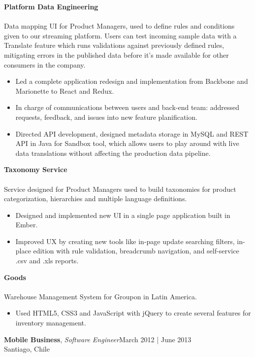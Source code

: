 \documentclass[line,letterpaper, 10pt]{res}
\begin{document}
\begin{resume}
	\textbf{Platform Data Engineering}\\ \\Data mapping UI for Product Managers, used to define rules and conditions given to our streaming platform. Users can test incoming sample data with a Translate feature which runs validations against previously defined rules, mitigating errors in the published data before it’s made available for other consumers in the company.\\
	\begin{itemize} \itemsep 3pt
	\item Led a complete application redesign and implementation from Backbone and Marionette to React and Redux.
	\item In charge of communications between users and back-end team: addressed requests, feedback, and issues into new feature planification.
	\item Directed API development, designed metadata storage in MySQL and REST API in Java for Sandbox tool, which allows users to play around with live data translations without affecting the production data pipeline.
	\end{itemize}

	\textbf{Taxonomy Service}\\ \\Service designed for Product Managers used to build taxonomies for product categorization, hierarchies and multiple language definitions.\\
	\begin{itemize} \itemsep 3pt
	\item Designed and implemented new UI in a single page application built in Ember.
	\item Improved UX by creating new tools like in-page update searching filters, in-place edition with rule validation, breadcrumb navigation, and self-service .csv and .xls reports.
	\end{itemize}

	\textbf{Goods}\\ \\ Warehouse Management System for Groupon in Latin America.\\
	\begin{itemize} \itemsep 3pt
	\item Used HTML5, CSS3 and JavaScript with jQuery to create several features for inventory management.
	\end{itemize}

	\textbf{Mobile Business}, {\sl Software Engineer}\hfill March 2012 | June 2013
	\\Santiago, Chile
	\\


\end{resume}
\end{document}
